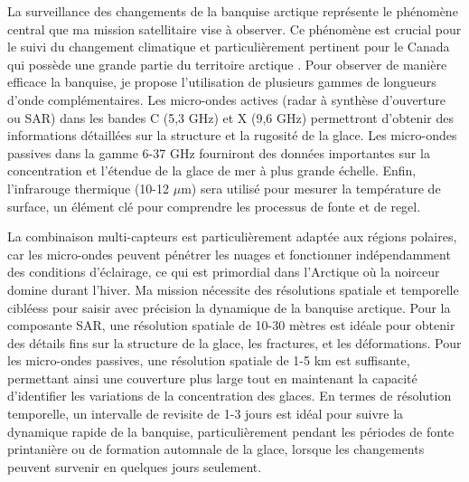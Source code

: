 \documentclass[12pt,a4paper]{article}
\begin{document}
La surveillance des changements de la banquise arctique représente le phénomène central que ma mission satellitaire vise à observer. Ce phénomène est crucial pour le suivi du changement climatique et particulièrement pertinent pour le Canada qui possède une grande partie du territoire arctique \citep{Derksen2019}. Pour observer de manière efficace la banquise, je propose l'utilisation de plusieurs gammes de longueurs d'onde complémentaires. Les micro-ondes actives (radar à synthèse d'ouverture ou SAR) dans les bandes C (5,3 GHz) et X (9,6 GHz) \citep{Liu2023} permettront d'obtenir des informations détaillées sur la structure et la rugosité de la glace. Les micro-ondes passives dans la gamme 6-37 GHz \citep{Webster2023} fourniront des données importantes sur la concentration et l'étendue de la glace de mer à plus grande échelle. Enfin, l'infrarouge thermique (10-12 $\mu$m) sera utilisé pour mesurer la température de surface, un élément clé pour comprendre les processus de fonte et de regel.

La combinaison multi-capteurs est particulièrement adaptée aux régions polaires, car les micro-ondes peuvent pénétrer les nuages et fonctionner indépendamment des conditions d'éclairage, ce qui est primordial dans l'Arctique où la noirceur domine durant l'hiver. Ma mission nécessite des résolutions spatiale et temporelle cibléess pour saisir avec précision la dynamique de la banquise arctique. Pour la composante SAR, une résolution spatiale de 10-30 mètres est idéale pour obtenir des détails fins sur la structure de la glace, les fractures, et les déformations. Pour les micro-ondes passives, une résolution spatiale de 1-5 km est suffisante, permettant ainsi une couverture plus large tout en maintenant la capacité d'identifier les variations de la concentration des glaces. En termes de résolution temporelle, un intervalle de revisite de 1-3 jours est idéal pour suivre la dynamique rapide de la banquise, particulièrement pendant les périodes de fonte printanière ou de formation automnale de la glace, lorsque les changements peuvent survenir en quelques jours seulement.
\end{document}
